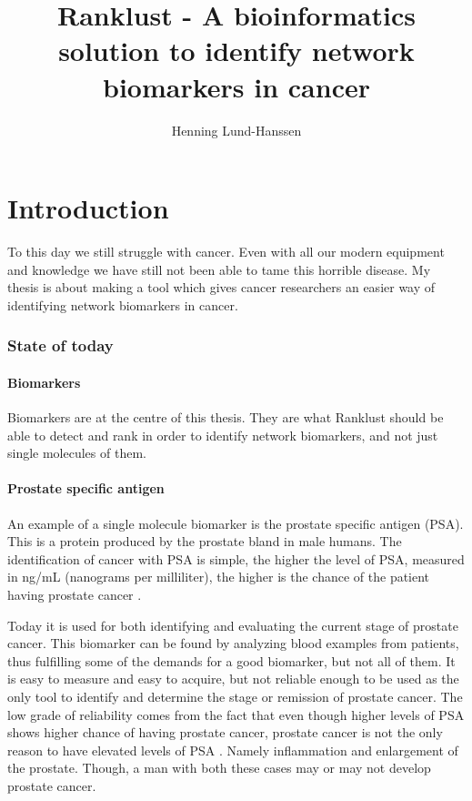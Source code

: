 \documentclass[UKenglish,11pt,a4paper]{article}
\title{Ranklust - A bioinformatics solution to identify network biomarkers in cancer}
\author{Henning Lund-Hanssen}
\begin{document}
\maketitle
\tableofcontents{}
\part{Introduction}
To this day we still struggle with cancer. Even with all our modern equipment and knowledge we have still not been able
to tame this horrible disease. My thesis is about making a tool which gives cancer researchers an easier way of
identifying network biomarkers in cancer. 
\section{State of today}
\subsection{Biomarkers}
Biomarkers are at the centre of this thesis. They are what Ranklust should be able to detect and rank in order to
identify network biomarkers, and not just single molecules of them. 
\subsection{Prostate specific antigen}
An example of a single molecule biomarker is the prostate specific antigen (PSA). This is a protein produced by the 
prostate bland in male humans. The identification of cancer with PSA is simple, the higher the level of PSA, measured in
ng/mL (nanograms per milliliter), the higher is the chance of the patient having prostate cancer \cite{cancerfacts}.

Today it is used for both identifying and
evaluating the current stage of prostate cancer. This biomarker can be found by analyzing blood examples from patients,
thus fulfilling some of the demands for a good biomarker, %
but not all of them. It is easy to measure and easy to acquire, but not reliable enough to be used as the only tool 
to identify and determine the stage or remission of prostate cancer. The low grade of reliability comes from the fact
that even though higher levels of PSA shows higher chance of having prostate cancer, prostate cancer is not the only
reason to have elevated levels of PSA \cite{cancerfacts}. 
Namely inflammation and enlargement of the prostate. Though, a man with both these cases may or may not develop prostate
cancer.
\end{document}
